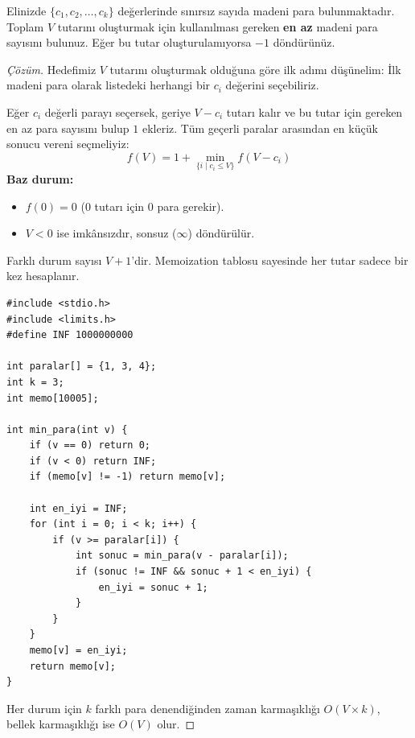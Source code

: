 \begin{example}
Elinizde $\{c_1, c_2, \dots, c_k\}$ değerlerinde sınırsız sayıda madeni para bulunmaktadır. Toplam $V$ tutarını oluşturmak için kullanılması gereken \textbf{en az} madeni para sayısını bulunuz. Eğer bu tutar oluşturulamıyorsa $-1$ döndürünüz.
\end{example}

\begin{proof}[Çözüm]
Hedefimiz $V$ tutarını oluşturmak olduğuna göre ilk adımı düşünelim: İlk madeni para olarak listedeki herhangi bir $c_i$ değerini seçebiliriz.

Eğer $c_i$ değerli parayı seçersek, geriye $V - c_i$ tutarı kalır ve bu tutar için gereken en az para sayısını bulup $1$ ekleriz. Tüm geçerli paralar arasından en küçük sonucu vereni seçmeliyiz:
\[
f(V) = 1 + \min_{\{i \mid c_i \le V\}} f(V - c_i)
\]
\textbf{Baz durum:}
\begin{itemize}
    \item $f(0) = 0$ (0 tutarı için 0 para gerekir).
    \item $V < 0$ ise imkânsızdır, sonsuz ($\infty$) döndürülür.
\end{itemize}

Farklı durum sayısı $V+1$'dir. Memoization tablosu sayesinde her tutar sadece bir kez hesaplanır.

\begin{lstlisting}[language=CTemel]
#include <stdio.h>
#include <limits.h>
#define INF 1000000000

int paralar[] = {1, 3, 4};
int k = 3;
int memo[10005];

int min_para(int v) {
    if (v == 0) return 0;
    if (v < 0) return INF;
    if (memo[v] != -1) return memo[v];

    int en_iyi = INF;
    for (int i = 0; i < k; i++) {
        if (v >= paralar[i]) {
            int sonuc = min_para(v - paralar[i]);
            if (sonuc != INF && sonuc + 1 < en_iyi) {
                en_iyi = sonuc + 1;
            }
        }
    }
    memo[v] = en_iyi;
    return memo[v];
}
\end{lstlisting}
Her durum için $k$ farklı para denendiğinden zaman karmaşıklığı $O(V \times k)$, bellek karmaşıklığı ise $O(V)$ olur.
\end{proof}

